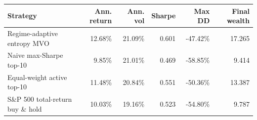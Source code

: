 \begin{tabular}{lrrrrr}
\hline
Strategy & Ann. return & Ann. vol & Sharpe & Max DD & Final wealth \\
\hline
Regime-adaptive entropy MVO & 12.68\% & 21.09\% & 0.601 & -47.42\% & 17.265 \\
Naive max-Sharpe top-10 & 9.85\% & 21.01\% & 0.469 & -58.85\% & 9.414 \\
Equal-weight active top-10 & 11.48\% & 20.84\% & 0.551 & -50.36\% & 13.387 \\
S\&P 500 total-return buy \& hold & 10.03\% & 19.16\% & 0.523 & -54.80\% & 9.787 \\
\hline
\end{tabular}
